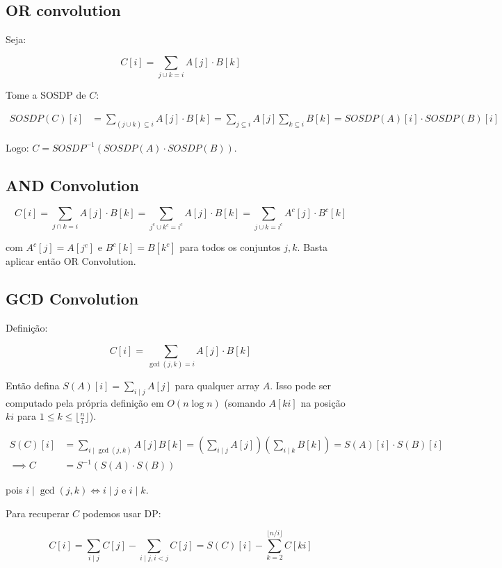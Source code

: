 \subsection{OR convolution}

Seja:

$$C[i] = \sum_{j \cup k = i} A[j] \cdot B[k]$$

Tome a SOSDP de $C$:

\begin{align*}
SOSDP(C)[i] &= \sum_{(j \cup k) \subseteq i} A[j] \cdot B[k] = \sum_{j \subseteq i}A[j]\sum_{k \subseteq i}B[k] = SOSDP(A)[i] \cdot SOSDP(B)[i]
\end{align*}

Logo: $C = SOSDP^{-1}(SOSDP(A) \cdot SOSDP(B))$.

\subsection{AND Convolution}

$$C[i] = \sum_{j \cap k = i} A[j] \cdot B[k] = \sum_{j^c \cup k^c = i^c} A[j] \cdot B[k] = \sum_{j \cup k = i^c}A^c[j] \cdot B^c[k]$$

com $A^c[j] = A[j^c]$ e $B^c[k] = B[k^c]$ para todos os conjuntos $j, k$. Basta aplicar então OR Convolution.

\subsection{GCD Convolution}

Definição:

$$C[i] = \sum_{\gcd(j, k) = i} A[j] \cdot B[k]$$

Então defina $S(A)[i] = \sum_{i \mid j}A[j]$ para qualquer array $A$. Isso pode ser computado pela própria definição em $O(n \log n)$ (somando $A[ki]$ na posição $ki$ para $1 \leq k \leq \lfloor \frac{n}{i} \rfloor$).

\begin{align*}
S(C)[i] &= \sum_{i \mid \gcd(j, k)}A[j]B[k] = \left(\sum_{i \mid j}A[j]\right)\left(\sum_{i \mid k}B[k]\right) = S(A)[i] \cdot S(B)[i] \\
\implies C &= S^{-1}(S(A) \cdot S(B))
\end{align*}

pois $i \mid \gcd(j, k) \iff i \mid j \text{ e } i \mid k$.

Para recuperar $C$ podemos usar DP:

$$C[i] = \sum_{i \mid j}C[j] - \sum_{i \mid j, i < j}C[j] = S(C)[i] - \sum_{k=2}^{\lfloor n/i \rfloor}C[ki]$$
